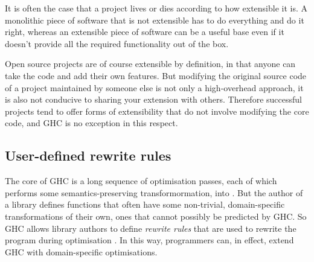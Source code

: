 \documentclass{article}
\let\cite=\citep
\begin{document}
It is often the case that a project lives or dies according to how
extensible it is.  A monolithic piece of software that is not
extensible has to do everything and do it right, whereas an extensible
piece of software can be a useful base even if it doesn't provide all
the required functionality out of the box.

Open source projects are of course extensible by definition, in that
anyone can take the code and add their own features.  But modifying
the original source code of a project maintained by someone else is
not only a high-overhead approach, it is also not conducive to sharing
your extension with others.  Therefore successful projects tend to
offer forms of extensibility that do not involve modifying the core
code, and GHC is no exception in this respect.

\subsection{User-defined rewrite rules}
\label{s:rules}

The core of GHC is a long sequence of optimisation passes, each of
which performs some semantics-preserving transformormation, \Core{}
into \Core{}.  But the author of a library defines functions that
often have some non-trivial, domain-specific transformations of their
own, ones that cannot possibly be predicted by GHC. So GHC allows
library authors to define \emph{rewrite rules} that are used
to rewrite the program during optimisation \cite{pj-et-al:playing-by-the-rules}.
In this way, programmers
can, in effect, extend GHC with domain-specific optimisations.
\end{document}
